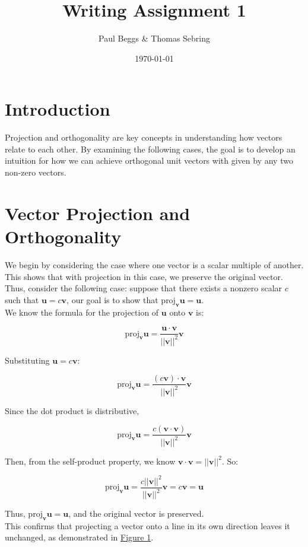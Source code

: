\documentclass{article}
\title{Writing Assignment 1}
\author{Paul Beggs \& Thomas Sebring}
\date{\today}
\newcommand{\mbf}[1]{\mathbf{#1}}
\begin{document}
\maketitle

\section{Introduction}

Projection and orthogonality are key concepts in understanding how vectors relate to each other. By examining the following cases, the goal is to develop an intuition for how we can achieve orthogonal unit vectors with given by any two non-zero vectors.  

\section{Vector Projection and Orthogonality}

We begin by considering the case where one vector is a scalar multiple of another. This shows that with projection in this case, we preserve the original vector. Thus, consider the following case: suppose that there exists a nonzero scalar \(c\) such that \(\mbf{u} = c \mbf{v}\), our goal is to show that \(\text{proj}_{\mbf{v}} \mbf{u} = \mbf{u}\). \\

We know the formula for the projection of \(\mbf{u}\) onto \(\mbf{v}\) is:

\[
\text{proj}_{\mbf{v}} \mbf{u} = \frac{\mbf{u} \cdot \mbf{v}}{||\mbf{v}||^2} \mbf{v}
\]

Substituting \(\mbf{u} = c \mbf{v}\):

\[
\text{proj}_{\mbf{v}} \mbf{u} = \frac{(c \mbf{v}) \cdot \mbf{v}}{||\mbf{v}||^2} \mbf{v}
\]

Since the dot product is distributive,

\[
\text{proj}_{\mbf{v}} \mbf{u} = \frac{c (\mbf{v} \cdot \mbf{v})}{||\mbf{v}||^2} \mbf{v}
\]

Then, from the self-product property, we know \(\mbf{v} \cdot \mbf{v} = ||\mbf{v}||^2\). So:

\[
\text{proj}_{\mbf{v}} \mbf{u} = \frac{c ||\mbf{v}||^2}{||\mbf{v}||^2} \mbf{v} = c \mbf{v} = \mbf{u}
\]

Thus, \(\text{proj}_{\mbf{v}} \mbf{u} = \mbf{u}\), and the original vector is preserved. \\

This confirms that projecting a vector onto a line in its own direction leaves it unchanged, as demonstrated in \hyperref[fig1]{Figure 1}.
\end{document}
